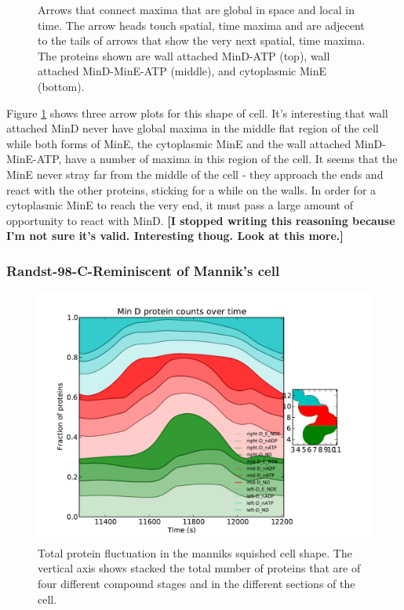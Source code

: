 \documentclass[letterpaper,twocolumn,amsmath,amssymb,pre]{revtex4-1}
\newcommand{\red}[1]{{\bf \color{red} #1}}
\newcommand{\fixme}[1]{\red{[#1]}}
\begin{document}
\begin{figure}
  \caption{Arrows that connect maxima that are global in space and
    local in time. The arrow heads touch spatial, time maxima and are
    adjecent to the tails of arrows that show the very next spatial,
    time maxima. The proteins shown are wall attached MinD-ATP (top),
    wall attached MinD-MinE-ATP (middle), and cytoplasmic MinE (bottom).}
  \label{arrow-plot-randst-97-plot}
\end{figure}

Figure \ref{arrow-plot-randst-97-plot} shows three arrow plots for
this shape of cell.  It's interesting that wall attached MinD never
have global maxima in the middle flat region of the cell while both
forms of MinE, the cytoplasmic MinE and the wall attached
MinD-MinE-ATP, have a number of maxima in this region of the cell.  It
seems that the MinE never stray far from the middle of the cell - they
approach the ends and react with the other proteins, sticking for a
while on the walls.  In order for a cytoplasmic MinE to reach the very
end, it must pass a large amount of opportunity to react with MinD.
\fixme{I stopped writing this reasoning because I'm not sure it's
  valid.  Interesting thoug.  Look at this more.}


\subsubsection{Randst-98-C-Reminiscent of Mannik's cell}
\begin{figure}
  \includegraphics[width=\columnwidth]{../data/shape-randst/plots/box-plot_D--randst-25-600-800-9800-1500}
  \caption{Total protein fluctuation in the manniks squished cell
    shape.  The vertical axis shows stacked the total number of
    proteins that are of four different compound stages and in the
    different sections of the cell.}
  \label{total-oscillation-randst-98-plot}
\end{figure}
\end{document}
